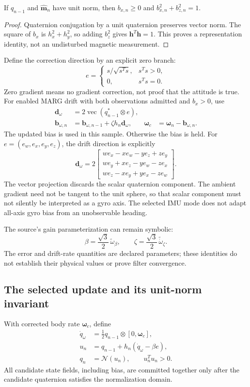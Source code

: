 \begin{proposition}
If $q_{n-1}$ and $\widehat{\boldsymbol m}_n$ have unit norm, then
$b_{x,n}\ge0$ and $b_{x,n}^2+b_{z,n}^2=1$.
\end{proposition}
\begin{proof}
Quaternion conjugation by a unit quaternion preserves vector norm. The square
of $b_x$ is $h_x^2+h_y^2$, so adding $b_z^2$ gives $\boldsymbol h^T\boldsymbol h=1$.
This proves a representation identity, not an undisturbed magnetic measurement.
\end{proof}

Define the correction direction by an explicit zero branch:
\[
e=\begin{cases}s/\sqrt{s^Ts},&s^Ts>0,\\0,&s^Ts=0.\end{cases}
\]
Zero gradient means no gradient correction, not proof that the attitude is true.
For enabled MARG drift with both observations admitted and $b_x>0$, use
\begin{align}
\boldsymbol d_\omega&=2\operatorname{vec}(q_{n-1}^*\otimes e),\\
\boldsymbol b_{\omega,n}&=\boldsymbol b_{\omega,n-1}
 +\zeta h_n\boldsymbol d_\omega,&
\boldsymbol\omega_c&=\boldsymbol\omega_n-\boldsymbol b_{\omega,n}.
\label{eq:mad-bias}
\end{align}
The updated bias is used in this sample. Otherwise the bias is held. For
$e=(e_w,e_x,e_y,e_z)$, the drift direction is explicitly
\[
\boldsymbol d_\omega=2\begin{bmatrix}
we_x-xe_w-ye_z+ze_y\\
we_y+xe_z-ye_w-ze_x\\
we_z-xe_y+ye_x-ze_w
\end{bmatrix}.
\]
The vector projection discards the scalar quaternion component. The ambient
gradient need not be tangent to the unit sphere, so that scalar component must
not silently be interpreted as a gyro axis. The selected IMU mode does not
adapt all-axis gyro bias from an unobservable heading.

The source's gain parameterization can remain symbolic:
\[
\beta=\frac{\sqrt3}{2}\,\widetilde\omega_\beta,\qquad
\zeta=\frac{\sqrt3}{2}\,\widetilde{\dot\omega}_\zeta.
\]
The error and drift-rate quantities are declared parameters; these identities
do not establish their physical values or prove filter convergence.

\subsection{The selected update and its unit-norm invariant}
With corrected body rate $\boldsymbol\omega_c$, define
\begin{align}
\dot q_\omega&=\tfrac12q_{n-1}\otimes[0,\boldsymbol\omega_c],\\
u_n&=q_{n-1}+h_n(\dot q_\omega-\beta e),\\
q_n&=\mathcal N(u_n),\qquad u_n^Tu_n>0.
\label{eq:mad-step}
\end{align}
All candidate state fields, including bias, are committed together only after
the candidate quaternion satisfies the normalization domain.

